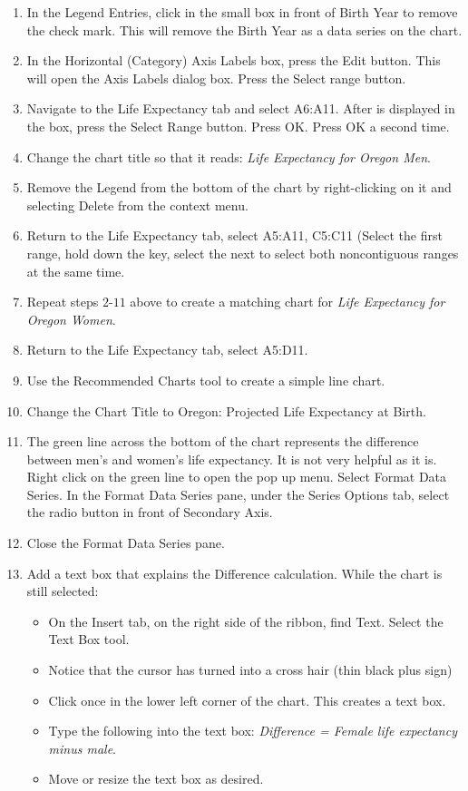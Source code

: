 \begin{enumerate}[resume]
	\item In the Legend Entries, click in the small box in front of Birth Year to remove the check mark. This will remove the Birth Year as a data series on the chart.
	\item In the Horizontal (Category) Axis Labels box, press the Edit button. This will open the Axis Labels dialog box. Press the Select range button.
	\item Navigate to the Life Expectancy tab and select \textsf{A6:A11}. After  is displayed in the box, press the Select Range button. Press OK. Press OK a second time.
	\item Change the chart title so that it reads: \textit{Life Expectancy for Oregon Men}.
	\item Remove the Legend from the bottom of the chart by right-clicking on it and selecting Delete from the context menu.
	\item Return to the Life Expectancy tab, select \textsf{A5:A11}, \textsf{C5:C11} (Select the first range, hold down the  key, select the next to select both noncontiguous ranges at the same time.
	\item Repeat steps $ 2 $-$ 11 $ above to create a matching chart for \textit{Life Expectancy for Oregon Women}.
	\item Return to the Life Expectancy tab, select \textsf{A5:D11}.
	\item Use the Recommended Charts tool to create a simple line chart.
	\item Change the Chart Title to \textsf{Oregon: Projected Life Expectancy at Birth}.
	\item The green line across the bottom of the chart represents the difference between men's and women's life expectancy. It is not very helpful as it is. Right click on the green line to open the pop up menu. Select Format Data Series. In the Format Data Series pane, under the Series Options tab, select the radio button in front of Secondary Axis.
	\item Close the Format Data Series pane.
	\item Add a text box that explains the Difference calculation. While the chart is still selected:
	
	\begin{itemize}
		\item On the Insert tab, on the right side of the ribbon, find Text. Select the Text Box tool.
		\item Notice that the cursor has turned into a cross hair (thin black plus sign)
		\item Click once in the lower left corner of the chart. This creates a text box.
		\item Type the following into the text box: \textit{Difference = Female life expectancy minus male}.
		\item Move or resize the text box as desired.
	\end{itemize}
	

\end{enumerate}

